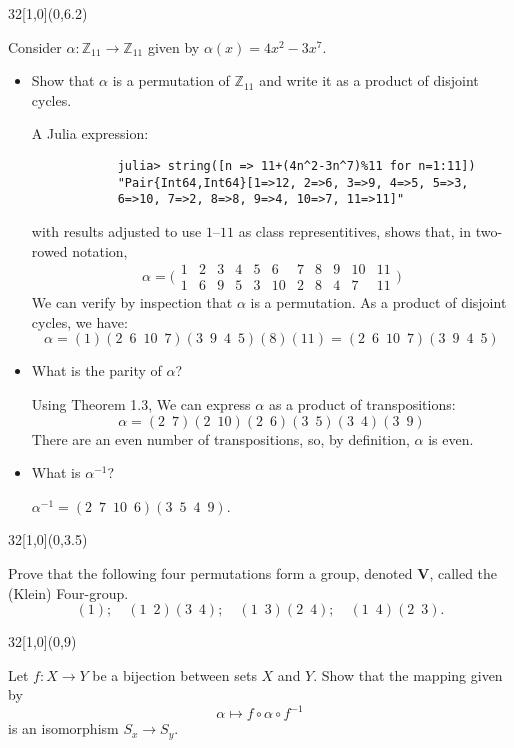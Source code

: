 \documentclass[12pt]{article}
\newcommand{\zee}{\mathbb{Z}}
\newenvironment{exercise}[2]{\begin{textblock}{32}[1,0](0,#2)\noindent#1\end{textblock}}{\vspace{1in}}
\begin{document}
\begin{exercise}{1.29}{6.2}
	{\noindent}Consider $\alpha: \zee_{11}\to \zee_{11}$ given by $\alpha(x)=4x^2-3x^7$.
	\begin{itemize}
		\item Show that $\alpha$ is a permutation of $\zee_{11}$ and write it as a product of disjoint cycles.
		\bigskip

		A Julia expression:
		\begin{verbatim}
			julia> string([n => 11+(4n^2-3n^7)%11 for n=1:11])
			"Pair{Int64,Int64}[1=>12, 2=>6, 3=>9, 4=>5, 5=>3,
			6=>10, 7=>2, 8=>8, 9=>4, 10=>7, 11=>11]"
		\end{verbatim}
		with results adjusted to use $1$--$11$ as class representitives, shows that, in two-rowed notation,
		\[
		\alpha = \bigl(\begin{array}{rrrrrrrrrrr}
		    1 &  2 &  3 &  4 &  5 &  6 &  7 &  8 &  9 & 10 & 11 \\
		    1 &  6 &  9 &  5 &  3 & 10 &  2 &  8 &  4 &  7 & 11
		  \end{array}\bigr)
		\]
		We can verify by inspection that $\alpha$ is a permutation. As a product of disjoint cycles, we have:
		\[ \alpha = (1)(2\enspace6\enspace10\enspace7)(3\enspace9\enspace4\enspace5)(8)(11) = (2\enspace6\enspace10\enspace7)(3\enspace9\enspace4\enspace5) \]

		\item What is the parity of $\alpha$?
		\bigskip

		Using Theorem 1.3, We can express $\alpha$ as a product of transpositions:
		\[ \alpha = (2\enspace7)(2\enspace10)(2\enspace6)(3\enspace5)(3\enspace4)(3\enspace9) \]
		There are an even number of transpositions, so, by definition, $\alpha$ is even.

		\item What is $\alpha^{-1}$?
		\bigskip

		$\alpha^{-1}=(2\enspace7\enspace10\enspace6)(3\enspace5\enspace4\enspace9)$.
	\end{itemize}
\end{exercise}


\begin{exercise}{1.36}{3.5}
	{\noindent}Prove that the following four permutations form a group, denoted $\mathbf{V}$, called the \\(Klein) Four-group.
	\[(1);\quad(1\enspace2)(3\enspace4);\quad(1\enspace3)(2\enspace4);\quad(1\enspace4)(2\enspace3).\]
	\bigskip

\end{exercise}


\begin{exercise}{1.39}{9}
	{\noindent}Let $f : X\to Y$ be a bijection between sets $X$ and $Y$. Show that the mapping given by \[\alpha \mapsto f\circ\alpha\circ f^{-1}\] is an isomorphism $S_x\to S_y$.
	\bigskip

\end{exercise}
\end{document}
